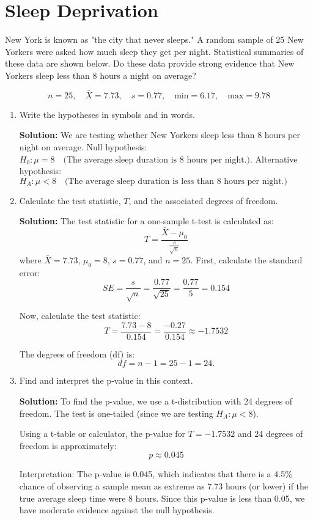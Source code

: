 \documentclass[12pt]{article}
\begin{document}
\section{Sleep Deprivation}

New York is known as "the city that never sleeps." A random sample of 25 New Yorkers were asked how much sleep they get per night. Statistical summaries of these data are shown below. Do these data provide strong evidence that New Yorkers sleep less than 8 hours a night on average?

\[
n = 25, \quad \bar{X} = 7.73, \quad s = 0.77, \quad \text{min} = 6.17, \quad \text{max} = 9.78
\]

\begin{enumerate}
    \item Write the hypotheses in symbols and in words.

\textbf{Solution:}
We are testing whether New Yorkers sleep less than 8 hours per night on average.
Null hypothesis:
$
H_0: \mu = 8 \quad \text{(The average sleep duration is 8 hours per night.)}
$. Alternative hypothesis:
$
H_A: \mu < 8 \quad \text{(The average sleep duration is less than 8 hours per night.)}
$
    \item  Calculate the test statistic, \( T \), and the associated degrees of freedom.

\textbf{Solution:}
The test statistic for a one-sample t-test is calculated as:
\[
T = \frac{\bar{X} - \mu_0}{\frac{s}{\sqrt{n}}}
\]
where \( \bar{X} = 7.73 \), \( \mu_0 = 8 \), \( s = 0.77 \), and \( n = 25 \).
First, calculate the standard error:
\[
SE = \frac{s}{\sqrt{n}} = \frac{0.77}{\sqrt{25}} = \frac{0.77}{5} = 0.154
\]

Now, calculate the test statistic:
\[
T = \frac{7.73 - 8}{0.154} = \frac{-0.27}{0.154} \approx -1.7532
\]

The degrees of freedom (df) is:
\[
df = n - 1 = 25 - 1 = 24.
\]


\item Find and interpret the p-value in this context.

\textbf{Solution:}
To find the p-value, we use a t-distribution with 24 degrees of freedom. The test is one-tailed (since we are testing \( H_A: \mu < 8 \)).

Using a t-table or calculator, the p-value for \( T = -1.7532 \) and 24 degrees of freedom is approximately:
\[
p \approx 0.045
\]

Interpretation: The p-value is 0.045, which indicates that there is a 4.5\% chance of observing a sample mean as extreme as 7.73 hours (or lower) if the true average sleep time were 8 hours. Since this p-value is less than 0.05, we have moderate evidence against the null hypothesis.



\end{enumerate}
\end{document}
